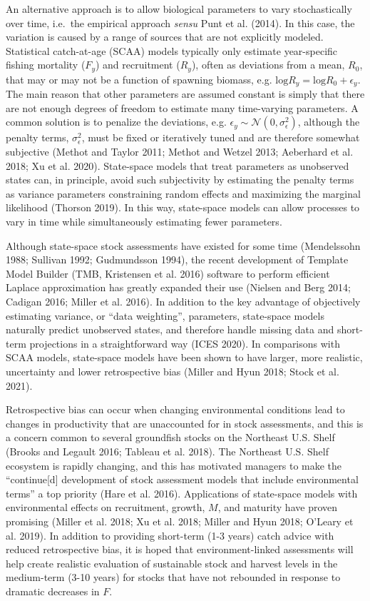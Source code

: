 \documentclass[]{article}
\begin{document}
An alternative approach is to allow biological parameters to vary
stochastically over time, i.e.~the empirical approach \emph{sensu} Punt
et al. (2014). In this case, the variation is caused by a range of
sources that are not explicitly modeled. Statistical catch-at-age (SCAA)
models typically only estimate year-specific fishing mortality (\(F_y\))
and recruitment (\(R_y\)), often as deviations from a mean, \(R_0\),
that may or may not be a function of spawning biomass, e.g.
\(\text{log}R_y = \text{log}R_0 + \epsilon_y\). The main reason that
other parameters are assumed constant is simply that there are not
enough degrees of freedom to estimate many time-varying parameters. A
common solution is to penalize the deviations, e.g.
\(\epsilon_y \sim \mathcal{N}(0,\sigma^2_\epsilon)\), although the
penalty terms, \(\sigma^2_\epsilon\), must be fixed or iteratively tuned
and are therefore somewhat subjective (Methot and Taylor 2011; Methot
and Wetzel 2013; Aeberhard et al. 2018; Xu et al. 2020). State-space
models that treat parameters as unobserved states can, in principle,
avoid such subjectivity by estimating the penalty terms as variance
parameters constraining random effects and maximizing the marginal
likelihood (Thorson 2019). In this way, state-space models can allow
processes to vary in time while simultaneously estimating fewer
parameters.

Although state-space stock assessments have existed for some time
(Mendelssohn 1988; Sullivan 1992; Gudmundsson 1994), the recent
development of Template Model Builder (TMB, Kristensen et al. 2016)
software to perform efficient Laplace approximation has greatly expanded
their use (Nielsen and Berg 2014; Cadigan 2016; Miller et al. 2016). In
addition to the key advantage of objectively estimating variance, or
``data weighting'', parameters, state-space models naturally predict
unobserved states, and therefore handle missing data and short-term
projections in a straightforward way (ICES 2020). In comparisons with
SCAA models, state-space models have been shown to have larger, more
realistic, uncertainty and lower retrospective bias (Miller and Hyun
2018; Stock et al. 2021).

Retrospective bias can occur when changing environmental conditions lead
to changes in productivity that are unaccounted for in stock
assessments, and this is a concern common to several groundfish stocks
on the Northeast U.S. Shelf (Brooks and Legault 2016; Tableau et al.
2018). The Northeast U.S. Shelf ecosystem is rapidly changing, and this
has motivated managers to make the ``continue{[}d{]} development of
stock assessment models that include environmental terms'' a top
priority (Hare et al. 2016). Applications of state-space models with
environmental effects on recruitment, growth, \(M\), and maturity have
proven promising (Miller et al. 2018; Xu et al. 2018; Miller and Hyun
2018; O'Leary et al. 2019). In addition to providing short-term (1-3
years) catch advice with reduced retrospective bias, it is hoped that
environment-linked assessments will help create realistic evaluation of
sustainable stock and harvest levels in the medium-term (3-10 years) for
stocks that have not rebounded in response to dramatic decreases in
\(F\).
\end{document}
